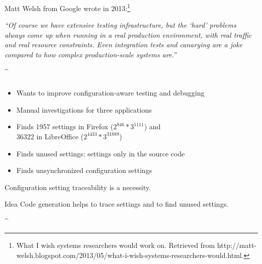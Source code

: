 \begin{frame}
	Matt Welsh from Google wrote in 2013:\footnote{What I wish systems researchers would work on. Retrieved from http://matt-welsh.blogspot.com/2013/05/what-i-wish-systems-researchers-would.html.}

	\vspace{2em}

	\emph{``Of course we have extensive testing infrastructure, but the ‘hard’ problems always
	come up when running in a real production environment, with real traffic and real
	resource constraints. Even integration tests and canarying are a joke compared to
	how complex production-scale systems are.''}
\end{frame}

\lstDeleteShortInline^
\begin{frame}
	\frametitle{\citet{jin2014configurations}}

	\begin{itemize}
	\item Wants to improve configuration-aware testing and debugging
	\item Manual investigations for three applications
	\item Finds 1957 settings in Firefox ($2^{846} * 3^{1111}$) and \\
		36322 in LibreOffice ($2^{4433} * 3^{31889}$)
	\item Finds unused settings: settings only in the source code
	\item Finds unsynchronized configuration settings
	\end{itemize}

	\begin{requirement}
	Configuration setting traceability is a necessity.
	\end{requirement}

	\begin{alertblock}{Idea}
	Code generation helps to trace settings and to find unused settings.
	\end{alertblock}
\end{frame}
\lstMakeShortInline[postbreak=,keywordstyle={},showspaces=no]^


